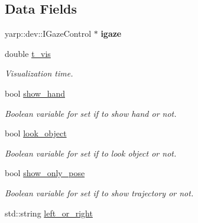 \subsection*{Data Fields}
\begin{DoxyCompactItemize}
\item 
yarp\+::dev\+::\+I\+Gaze\+Control $\ast$ {\bfseries igaze}\label{classGraspVisualization_a21aac46017bc0d4b77d37657715961c0}

\item 
double \hyperlink{classGraspVisualization_a99b826fdf481e24b0257eea6c1942f8d}{t\+\_\+vis}\label{classGraspVisualization_a99b826fdf481e24b0257eea6c1942f8d}

\begin{DoxyCompactList}\small\item\em Visualization time. \end{DoxyCompactList}\item 
bool \hyperlink{classGraspVisualization_a973a23fe3e4429f3d8c420d27b5ce77f}{show\+\_\+hand}\label{classGraspVisualization_a973a23fe3e4429f3d8c420d27b5ce77f}

\begin{DoxyCompactList}\small\item\em Boolean variable for set if to show hand or not. \end{DoxyCompactList}\item 
bool \hyperlink{classGraspVisualization_a166196c3b0420564d434a93987223951}{look\+\_\+object}\label{classGraspVisualization_a166196c3b0420564d434a93987223951}

\begin{DoxyCompactList}\small\item\em Boolean variable for set if to look object or not. \end{DoxyCompactList}\item 
bool \hyperlink{classGraspVisualization_a12af63a6de8420f32b727aa934c68c8c}{show\+\_\+only\+\_\+pose}\label{classGraspVisualization_a12af63a6de8420f32b727aa934c68c8c}

\begin{DoxyCompactList}\small\item\em Boolean variable for set if to show trajectory or not. \end{DoxyCompactList}\item 
std\+::string \hyperlink{classGraspVisualization_ac960abe59ca5c92521d9cb9f01dc6370}{left\+\_\+or\+\_\+right}\label{classGraspVisualization_ac960abe59ca5c92521d9cb9f01dc6370}


\end{DoxyCompactItemize}
